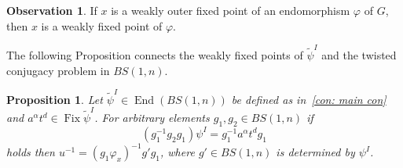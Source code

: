 \documentclass[a4paper]{amsart}
\newtheorem{prop}[thm]{Proposition}
\theoremstyle{definition}
\newtheorem{obs}[thm]{Observation}
\newcommand{\End}{\operatorname{End}}
\newcommand{\Fix}{\operatorname{Fix}}
\begin{document}
\begin{obs}\label{obs: WFOP}
    If $x$ is a weakly outer fixed point of an endomorphism $\varphi$ of $G$, then $x$ is a weakly fixed point of $\varphi$.
\end{obs}


The following Proposition connects the weakly fixed points of $\widetilde{\psi}^{I}$ and the twisted conjugacy problem in $BS(1,n)$.

\begin{prop}\label{prop: TCP WFP}
    Let $\widetilde{\psi}^I \in \End(BS(1,n))$ be defined as in~\ref{con: main con} and $a^{\alpha}t^d \in \Fix \widetilde{\psi}^I$. For arbitrary elements $g_1, g_2 \in BS(1,n)$ if
    \[
        (g_1^{-1}g_2 g_1)\psi^{I} = g_1^{-1} a^{\alpha}t^d g_1
    \]
    holds then $u^{-1} = (g_1\varphi_x)^{-1} g' g_1$, where $g' \in BS(1,n)$ is determined by $\psi^{I}$.
\end{prop}
\end{document}
